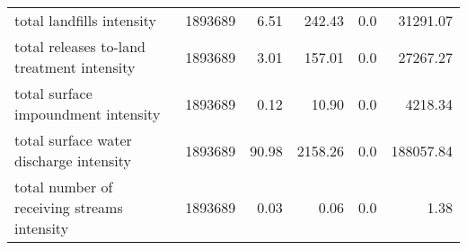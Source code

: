 \begin{table}[H]
\begin{tabular}{lrrrrr}
        total landfills intensity                   & 1893689 & 6.51   & 242.43  & 0.0  & 31291.07  \\
        total releases to-land treatment intensity  & 1893689 & 3.01   & 157.01  & 0.0  & 27267.27  \\
        total surface impoundment intensity         & 1893689 & 0.12   & 10.90   & 0.0  & 4218.34   \\
        total surface water discharge intensity     & 1893689 & 90.98  & 2158.26 & 0.0  & 188057.84 \\
        total number of receiving streams intensity & 1893689 & 0.03   & 0.06    & 0.0  & 1.38      \\\bottomrule\bottomrule
    \end{tabular}
\end{table}
